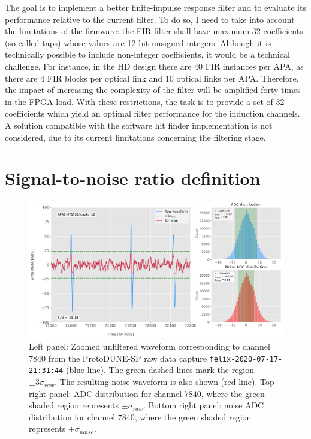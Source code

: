 The goal is to implement a better finite-impulse response filter and to evaluate its performance relative to the current filter. To do so, I need to take into account the limitations of the firmware: the FIR filter shall have maximum 32 coefficients (so-called taps) whose values are 12-bit unsigned integers. Although it is technically possible to include non-integer coefficients, it would be a technical challenge. For instance, in the HD design there are 40 FIR instances per APA, as there are 4 FIR blocks per optical link and 10 optical links per APA. Therefore, the impact of increasing the complexity of the filter will be amplified forty times in the FPGA load. With these restrictions, the task is to provide a set of 32 coefficients which yield an optimal filter performance for the induction channels. A solution compatible with the software hit finder implementation is not considered, due to its current limitations concerning the filtering stage.

\section{Signal-to-noise ratio definition}
\label{sec:matched_filter_sn_definition}

\begin{figure}[t]
	\centering
	\includegraphics[width=1\linewidth]{Images/Matched_Filter/waveform_example_raw}
	\caption[Example unfiltered waveform from a ProtoDUNE-SP raw data capture.]{Left panel: Zoomed unfiltered waveform corresponding to channel $7840$ from the ProtoDUNE-SP raw data capture \texttt{felix-2020-07-17-21:31:44} (blue line). The green dashed lines mark the region $\pm3\sigma_{raw}$. The resulting noise waveform is also shown (red line). Top right panel: ADC distribution for channel $7840$, where the green shaded region represents $\pm \sigma_{raw}$. Bottom right panel: noise ADC distribution for channel $7840$, where the green shaded region represents $\pm \sigma_{noise}$.}
	\label{fig:adcs_nofir}
\end{figure}

